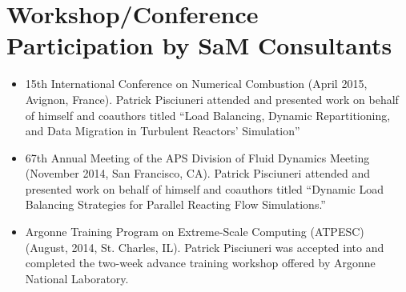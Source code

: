 \documentclass{article}
\begin{document}
\section*{Workshop/Conference Participation by SaM Consultants}
\begin{itemize}
\item 15th International Conference on Numerical Combustion (April 2015, Avignon, France).  Patrick Pisciuneri attended and presented work on behalf of himself and coauthors titled ``Load Balancing, Dynamic Repartitioning, and Data Migration in Turbulent Reactors' Simulation''
\item 67th Annual Meeting of the APS Division of Fluid Dynamics Meeting (November 2014, San Francisco, CA).  Patrick Pisciuneri attended and presented work on behalf of himself and coauthors titled ``Dynamic Load Balancing Strategies for Parallel Reacting Flow Simulations.''
\item Argonne Training Program on Extreme-Scale Computing (ATPESC) (August, 2014, St. Charles, IL).  Patrick Pisciuneri was accepted into and completed the two-week advance training workshop offered by Argonne National Laboratory.
\end{itemize}
\end{document}
